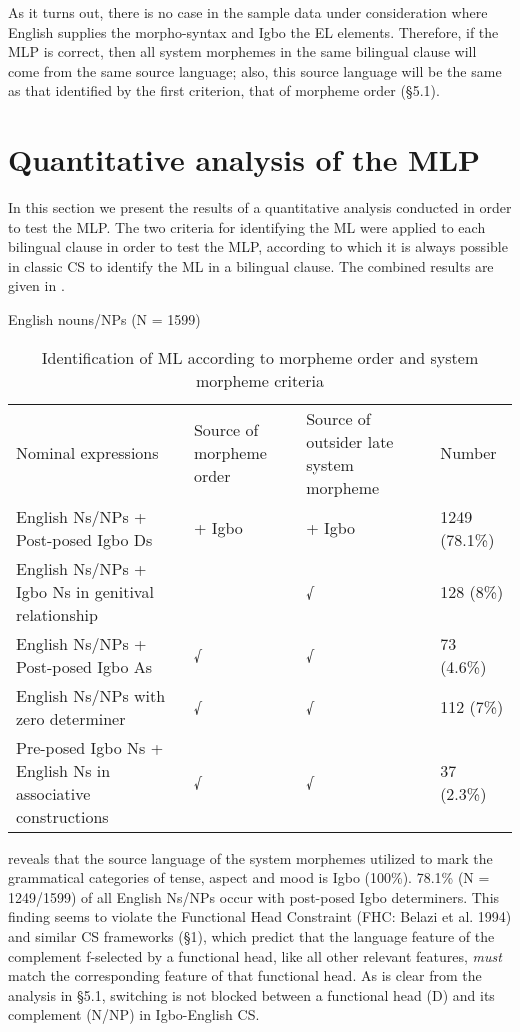 \documentclass[output=paper]{langsci/langscibook}
\begin{document}
As it turns out, there is no case in the sample data under consideration where English supplies the morpho-syntax and Igbo the EL elements. Therefore, if the MLP is correct, then all system morphemes in the same bilingual clause will come from the same source language; also, this source language will be the same as that identified by the first criterion, that of morpheme order (§5.1).

\section{Quantitative analysis of the MLP}

In this section we present the results of a quantitative analysis conducted in order to test the MLP. The two criteria for identifying the ML were applied to each bilingual clause in order to test the MLP, according to which it is always possible in classic CS to identify the ML in a bilingual clause. The combined results are given in . 
 
\begin{table}
English nouns/NPs (N = 1599)

\begin{tabularx}{\textwidth}{XXXX}
Nominal expressions                                             & Source of morpheme order & Source of outsider late system morpheme & Number \\
English Ns/NPs + Post-posed Igbo Ds                             & + Igbo   &   + Igbo & 1249 (78.1\%) \\
English Ns/NPs + Igbo Ns in genitival relationship             &          &    √       & 128 (8\%)     \\
English Ns/NPs + Post-posed Igbo As                            &  √      &     √      &  73 (4.6\%)   \\
English Ns/NPs with zero determiner                            &  √     &      √      &  112 (7\%)   \\
Pre-posed Igbo Ns + English Ns in associative constructions   &   √    &       √      & 37 (2.3\%)   \\
\end{tabularx}
     
\caption{Identification of ML according to morpheme order and system morpheme criteria}
\label{tab:2}
\end{table} 

 reveals that the source language of the system morphemes utilized to mark the grammatical categories of tense, aspect and mood is Igbo (100\%). 78.1\% (N = 1249/1599) of all English Ns/NPs occur with post-posed Igbo determiners. This finding seems to violate the Functional Head Constraint (FHC: Belazi et al. 1994) and similar CS frameworks (§1), which predict that the language feature of the complement f-selected by a functional head, like all other relevant features, \textit{must} match the corresponding feature of that functional head. As is clear from the analysis in §5.1, switching is not blocked between a functional head (D) and its complement (N/NP) in Igbo-English CS. 
\end{document}
